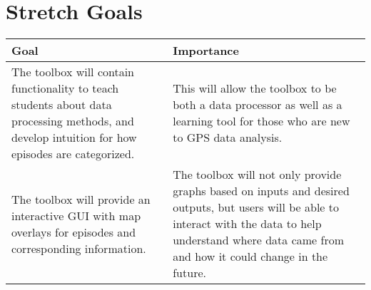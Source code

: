 \documentclass{article}
\begin{document}
\section{Stretch Goals}

\begin{tabular}{|p{6cm}|p{6cm}|}
    		\hline
    		\textbf{Goal} & \textbf{Importance} \\
    		\hline
    		The toolbox will contain functionality to teach students about data processing methods, and develop intuition for how episodes are categorized. & This will allow the toolbox to be both a data processor as well as a learning tool for those who are new to GPS data analysis.  \\
    		\hline
    		The toolbox will provide an interactive GUI with map overlays for episodes and corresponding information. & The toolbox will not only provide graphs based on inputs and desired outputs, but users will be able to interact with the data to help understand where data came from and how it could change in the future.  \\
    		\hline
\end{tabular}
\end{document}
